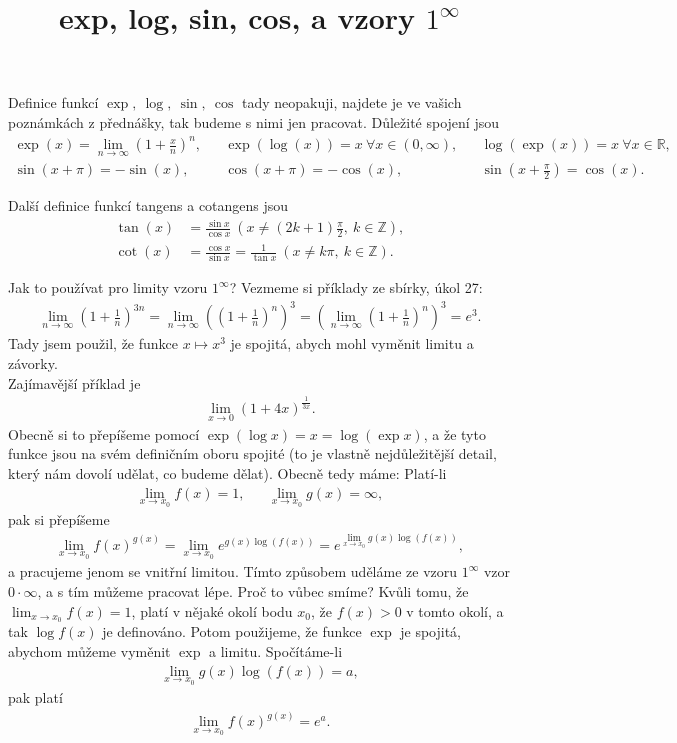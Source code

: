 \documentclass[10pt,a4paper]{article}
\title{exp, log, sin, cos, a vzory $1^\infty$}
\newcommand{\R}{\mathbb{R}}
\begin{document}
\maketitle

Definice funkcí $\exp, \ \log, \ \sin, \ \cos$ tady neopakuji, najdete je ve vašich poznámkách z přednášky, tak budeme s nimi jen pracovat. Důležité spojení jsou
\begin{align*}
\exp(x) = \lim_{n \to \infty} \left(1 + \frac{x}{n}\right)^n, && \exp (\log(x)) = x \ \forall x \in (0,\infty), && \log(\exp(x)) = x \ \forall x \in \R, \\
\sin(x+\pi)=-\sin(x), && \cos(x+\pi) = - \cos(x), && \sin(x+\frac{\pi}{2}) = \cos(x).
\end{align*}

Další definice funkcí tangens a cotangens jsou
\begin{align*}
\tan(x) &= \frac{\sin x }{\cos x} \ (x \neq (2k+1) \frac{\pi}{2}, \ k \in \mathbb{Z}), \\
\cot(x) &= \frac{\cos x}{\sin x} = \frac{1}{\tan x} \ (x \neq k \pi, \ k \in \mathbb{Z}).
\end{align*}

Jak to používat pro limity vzoru $1^\infty$? Vezmeme si příklady ze sbírky, úkol 27:
\begin{align*}
\lim_{n \to \infty} \left(1 + \frac1n \right)^{3n} = \lim_{n \to \infty} \left(\left(1 + \frac1n \right)^{n} \right)^3 = \left( \lim_{n \to \infty} \left(1 + \frac1n \right)^{n} \right)^3 = e^3.
\end{align*}
Tady jsem použil, že funkce $x \mapsto x^3$ je spojitá, abych mohl vyměnit limitu a závorky.\\

Zajímavější příklad je
\begin{align*}
\lim_{x \to 0} (1+4x)^\frac{1}{3x}.
\end{align*}
Obecně si to přepíšeme pomocí $\exp(\log x) = x = \log (\exp x)$, a že tyto funkce jsou na svém definičním oboru spojité (to je vlastně nejdůležitější detail, který nám dovolí udělat, co budeme dělat). Obecně tedy máme: Platí-li
\begin{align*}
\lim_{x \to x_0} f(x) = 1, && \lim_{x \to x_0} g(x) = \infty,
\end{align*}
pak si přepíšeme
\begin{align*}
\lim_{x \to x_0} f(x)^{g(x)} = \lim_{x \to x_0} e^{g(x) \log(f(x))} = e^{\lim_{x \to x_0} g(x) \log(f(x))},
\end{align*}
a pracujeme jenom se vnitřní limitou. Tímto způsobem uděláme ze vzoru $1^\infty$ vzor $0 \cdot \infty$, a s tím můžeme pracovat lépe. Proč to vůbec smíme? Kvůli tomu, že $\lim_{x \to x_0} f(x) = 1$, platí v nějaké okolí bodu $x_0$, že $f(x)>0$ v tomto okolí, a tak $\log f(x)$ je definováno. Potom použijeme, že funkce $\exp$ je spojitá, abychom můžeme vyměnit $\exp$ a limitu. Spočítáme-li 
\begin{align*}
\lim_{x \to x_0} g(x) \log(f(x)) = a,
\end{align*}
pak platí
\begin{align*}
\lim_{x \to x_0} f(x)^{g(x)} = e^a.
\end{align*}
\end{document}
